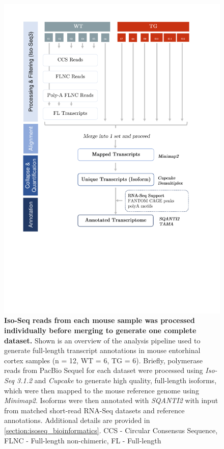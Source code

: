 \begin{figure}[htp]
	\centering
	\vspace{20pt}
	\includegraphics[page=1,trim={0 7cm 2cm 1cm},clip, scale = 0.7]{Figures/WholeTranscriptome_Figures.pdf}
	\captionsetup{width=0.95\textwidth}
	\caption[Detailed Iso-Seq bioinformatics pipeline for global transcriptome profiling]%
	{\textbf{Iso-Seq reads from each mouse sample was processed individually before merging to generate one complete dataset.} Shown is an overview of the analysis pipeline used to generate full-length transcript annotations in mouse entorhinal cortex samples (n = 12, WT = 6, TG = 6). Briefly, polymerase reads from PacBio Sequel for each dataset were processed using \textit{Iso-Seq 3.1.2} and \textit{Cupcake} to generate high quality, full-length isoforms, which were then mapped to the mouse reference genome using \textit{Minimap2}. Isoforms were then annotated with \textit{SQANTI2} with input from matched short-read RNA-Seq datasets and reference annotations. Additional details are provided in \cref{section:isoseq_bioinformatics}. CCS - Circular Consensus Sequence, FLNC - Full-length non-chimeric, FL - Full-length}
	\label{fig:isoseq_whole_pipeline}
\end{figure}
 
